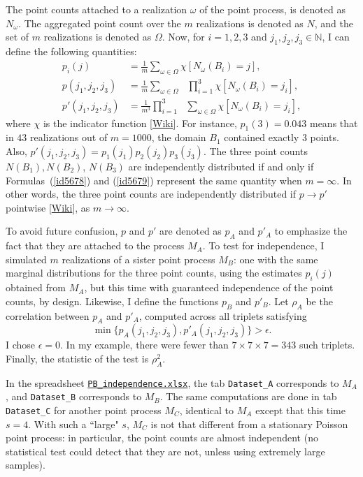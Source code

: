 \documentclass[10pt]{article}
\begin{document}
The point counts attached to a realization $\omega$ of the point process, is denoted as $N_\omega$. The aggregated point count over the $m$ realizations is denoted as $N$, and the set of $m$ realizations is denoted as $\Omega$. Now, for $i=1,2,3$ and $j_1,j_2,j_3\in\mathbb{N}$, I can define the following quantities:
\begin{align}
p_i(j) & =  \frac{1}{m}\sum_{\omega\in\Omega} \chi[N_\omega(B_i)=j], \nonumber \\
p(j_1,j_2,j_3) & =\frac{1}{m}\sum_{\omega\in\Omega} \mbox{ } \prod_{i=1}^3 \chi[N_\omega(B_i)=j_i],\label{id5678} \\
p'(j_1,j_2,j_3) &=\frac{1}{m^3}\prod_{i=1}^3 \mbox{  } \sum_{\omega\in\Omega} \chi[N_\omega(B_i)=j_i], \label{id5679}
\end{align}
where $\chi$ is the indicator function [\href{https://en.wikipedia.org/wiki/Indicator_function}{Wiki}]. For instance, $p_1(3)=0.043$ means that in $43$ realizations out of $m=\num{1000}$, the domain $B_1$ contained exactly $3$ points. Also, $p'(j_1,j_2,j_3) =p_1(j_1)p_2(j_2)p_3(j_3)$. The three point counts $N(B_1),N(B_2)$, $N(B_3)$ are independently distributed if and only if Formulas~(\ref{id5678}) and (\ref{id5679}) represent
the same quantity when $m=\infty$. In other words, the three point counts are independently distributed if $p\rightarrow p'$ pointwise [\href{https://en.wikipedia.org/wiki/Pointwise_convergence}{Wiki}], as $m\rightarrow\infty$.

To avoid future confusion, $p$ and $p'$ are denoted as $p_A$ and $p'_A$ to emphasize the fact that they are attached to the process $M_A$.
To test for independence, I simulated $m$ realizations of a sister point process $M_B$: one with the same marginal distributions for the three point counts, using the
estimates $p_i(j)$ obtained from $M_A$, but this time with guaranteed independence of the point counts, by design. Likewise, I
define the functions $p_B$ and $p'_B$. Let $\rho_A$ be the correlation between $p_A$ and $p'_A$, computed across all triplets satisfying
$$\min \{p_A(j_1,j_2,j_3), p'_A(j_1,j_2,j_3)\}>\epsilon.$$
I chose $\epsilon=0$. In my example, there were fewer than $7\times 7  \times 7= 343$ such triplets.
Finally, the statistic of the test is $\rho_A^2$. \\


\noindent In the spreadsheet \href{https://github.com/VincentGranville/Point-Processes/tree/main/Spreadsheets}{\texttt{PB\_independence.xlsx}},
the tab \texttt{Dataset\_A} corresponds to $M_A$, and \texttt{Dataset\_B} corresponds to $M_B$. The same computations are done in
tab \texttt{Dataset\_C} for another point process $M_C$, identical to $M_A$ except that this time $s=4$. With such a ``large" $s$, $M_C$ is not that different
from a stationary Poisson point process: in particular, the point counts are almost independent (no statistical test could detect that they are not, unless using extremely large samples).
\end{document}
